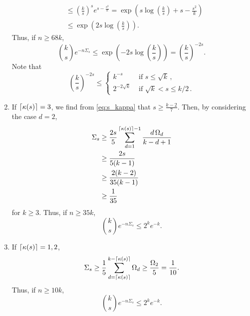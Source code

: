 \documentclass[11pt,onecolumn]{IEEEtran}
\newcommand{\beq}{\begin{equation}}
\newcommand{\eeq}{\end{equation}}
\DeclarePairedDelimiter\ceil{\lceil}{\rceil}
\begin{document}
\begin{enumerate}
\begin{equation*}
\begin{split}
&\leq \left( \frac{k}{s} \right)^s e^{s-\frac{s^2}{k}} = \exp \left( s \log \left( \frac{k}{s} \right) + s - \frac{s^2}{k} \right) \\
&\leq \exp \left( 2s \log \left( \frac{k}{s} \right) \right).
\end{split} \end{equation*}
Thus, if $n \geq 68k$,
$$
\binom{k}{s} e^{-n\Sigma_s} \leq \exp \left( -2s \log \left( \frac{k}{s} \right) \right) = \left( \frac{k}{s} \right)^{-2s}.
$$
Note that
$$
\left( \frac{k}{s} \right)^{-2s} \leq
	\begin{cases}
	k^{-s} & \text{ if } s \leq \sqrt k \,, \\
	2^{-2\sqrt k} &\text{ if } \sqrt k < s \leq k/2 \,.
	\end{cases}
$$
\item If $\ceil*{\kappa(s)} = 3$, we find from \eqref{eq:s_kappa} that $s \geq \frac{k-2}{7}$. Then, by considering the case $d=2$,
\beq\nonumber
\begin{aligned}
\Sigma_s &\geq \frac{2s}{5} \sum_{d=1}^{\ceil*{\kappa(s)}-1} \frac{d\,\Omega_d}{k-d+1}\\
& \geq \frac{2s}{5(k-1)}\\
& \geq \frac{2(k-2)}{35(k-1)} \\
&\geq \frac{1}{35}
\end{aligned}
\eeq
for $k \geq 3$. Thus, if $n \geq 35k$,
$$
\binom{k}{s} e^{-n\Sigma_s} \leq 2^k e^{-k}.
$$

\item If $\ceil*{\kappa(s)} = 1, 2$,
$$
\Sigma_s \geq \frac{1}{5} \sum_{d=\ceil*{\kappa(s)}}^{k-\ceil*{\kappa(s)}} \Omega_d \geq \frac{\Omega_2}{5} = \frac{1}{10}.
$$
Thus, if $n \geq 10k$,
$$
\binom{k}{s} e^{-n\Sigma_s} \leq 2^k e^{-k}.
$$
\end{enumerate}

\fi








\appendices
\end{document}
